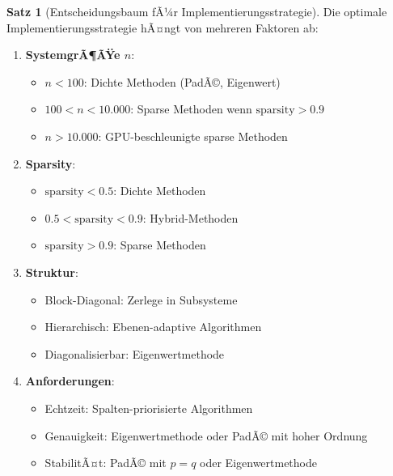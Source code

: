﻿\documentclass[a4paper,12pt]{report}
\theoremstyle{definition}
\newtheorem{satz}{Satz}
\begin{document}
	\begin{satz}[Entscheidungsbaum fÃ¼r Implementierungsstrategie]
		Die optimale Implementierungsstrategie hÃ¤ngt von mehreren Faktoren ab:
		
		\begin{enumerate}
			\item \textbf{SystemgrÃ¶ÃŸe $n$}:
			\begin{itemize}
				\item $n < 100$: Dichte Methoden (PadÃ©, Eigenwert)
				\item $100 < n < 10.000$: Sparse Methoden wenn $\text{sparsity} > 0.9$
				\item $n > 10.000$: GPU-beschleunigte sparse Methoden
			\end{itemize}
			
			\item \textbf{Sparsity}:
			\begin{itemize}
				\item $\text{sparsity} < 0.5$: Dichte Methoden
				\item $0.5 < \text{sparsity} < 0.9$: Hybrid-Methoden
				\item $\text{sparsity} > 0.9$: Sparse Methoden
			\end{itemize}
			
			\item \textbf{Struktur}:
			\begin{itemize}
				\item Block-Diagonal: Zerlege in Subsysteme
				\item Hierarchisch: Ebenen-adaptive Algorithmen
				\item Diagonalisierbar: Eigenwertmethode
			\end{itemize}
			
			\item \textbf{Anforderungen}:
			\begin{itemize}
				\item Echtzeit: Spalten-priorisierte Algorithmen
				\item Genauigkeit: Eigenwertmethode oder PadÃ© mit hoher Ordnung
				\item StabilitÃ¤t: PadÃ© mit $p = q$ oder Eigenwertmethode
			\end{itemize}
		\end{enumerate}
	\end{satz}
	
\end{document}
